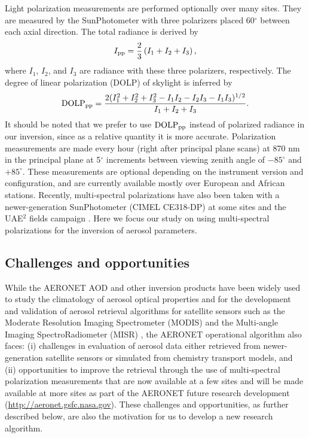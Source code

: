 Light polarization measurements are performed optionally over many sites. They
are measured by the SunPhotometer with three polarizers placed
60$^\circ$ between each axial direction. The total radiance is derived by 
\begin{equation}
I_\text{pp} = \frac{2}{3}\left( I_1+I_2+I_3 \right),
\end{equation}
where $I_1$, $I_2$, and $I_3$ are radiance with these three polarizers,
respectively. The degree of linear polarization (DOLP) of skylight is inferred
by
\begin{equation}
\text{DOLP}_\text{pp} = \frac{2(I_1^2+I_2^2+I_3^2-I_1I_2-I_2I_3-I_1I_3)^{1/2}}{I_1+I_2+I_3}.
\end{equation}
It should be noted that we prefer to use $\text{DOLP}_\text{pp}$ instead of polarized radiance
in our inversion, since as a relative quantity it is more accurate.
Polarization measurements are made every hour (right after principal plane
scans) at 870 nm in the principal plane at 5$^\circ$ increments between viewing zenith
angle of $-85^\circ$ and $+85^\circ$. These measurements are optional depending on the
instrument version and configuration, and are currently available mostly over
European and African stations. Recently, multi-spectral polarizations have also
been taken with a newer-generation SunPhotometer (CIMEL CE318-DP) at some sites
\citep{Li09} and the UAE$^2$ fields campaign \citep{Reid08}. Here we
focus our study on using multi-spectral polarizations for the inversion of
aerosol parameters.

\subsection{Challenges and opportunities}

While the AERONET AOD and other inversion products have been widely used to
study the climatology of aerosol optical properties \citep{Dubovik02b,Levy07a}
and for the development and validation of aerosol retrieval
algorithms for satellite sensors such as the Moderate Resolution Imaging
Spectrometer (MODIS) \citep{Kaufman97,Remer05,Levy07b,Levy10,Wang10}
and the Multi-angle Imaging SpectroRadiometer
(MISR) \citep{Diner98,Kahn10}, the AERONET operational
algorithm also faces: (i) challenges in evaluation of aerosol data either
retrieved from newer-generation satellite sensors or simulated from chemistry
transport models, and (ii) opportunities to improve the retrieval through the
use of multi-spectral polarization measurements that are now available at a few
sites and will be made available at more sites as part of the AERONET future
research development (\url{http://aeronet.gsfc.nasa.gov}). These challenges and
opportunities, as further described below, are also the motivation for us to
develop a new research algorithm.

